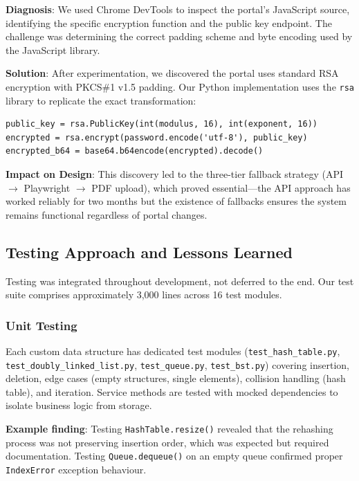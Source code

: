 \documentclass[11pt,a4paper]{article}
\begin{document}
\textbf{Diagnosis}: We used Chrome DevTools to inspect the portal's JavaScript source, identifying the specific encryption function and the public key endpoint. The challenge was determining the correct padding scheme and byte encoding used by the JavaScript library.

\textbf{Solution}: After experimentation, we discovered the portal uses standard RSA encryption with PKCS\#1 v1.5 padding. Our Python implementation uses the \texttt{rsa} library to replicate the exact transformation:

\begin{verbatim}
public_key = rsa.PublicKey(int(modulus, 16), int(exponent, 16))
encrypted = rsa.encrypt(password.encode('utf-8'), public_key)
encrypted_b64 = base64.b64encode(encrypted).decode()
\end{verbatim}

\textbf{Impact on Design}: This discovery led to the three-tier fallback strategy (API $\rightarrow$ Playwright $\rightarrow$ PDF upload), which proved essential---the API approach has worked reliably for two months but the existence of fallbacks ensures the system remains functional regardless of portal changes.

\subsection{Testing Approach and Lessons Learned}
Testing was integrated throughout development, not deferred to the end. Our test suite comprises approximately 3,000 lines across 16 test modules.

\subsubsection{Unit Testing}
Each custom data structure has dedicated test modules (\texttt{test\_hash\_table.py}, \texttt{test\_doubly\_linked\_list.py}, \texttt{test\_queue.py}, \texttt{test\_bst.py}) covering insertion, deletion, edge cases (empty structures, single elements), collision handling (hash table), and iteration. Service methods are tested with mocked dependencies to isolate business logic from storage.

\textbf{Example finding}: Testing \texttt{HashTable.resize()} revealed that the rehashing process was not preserving insertion order, which was expected but required documentation. Testing \texttt{Queue.dequeue()} on an empty queue confirmed proper \texttt{IndexError} exception behaviour.
\end{document}
